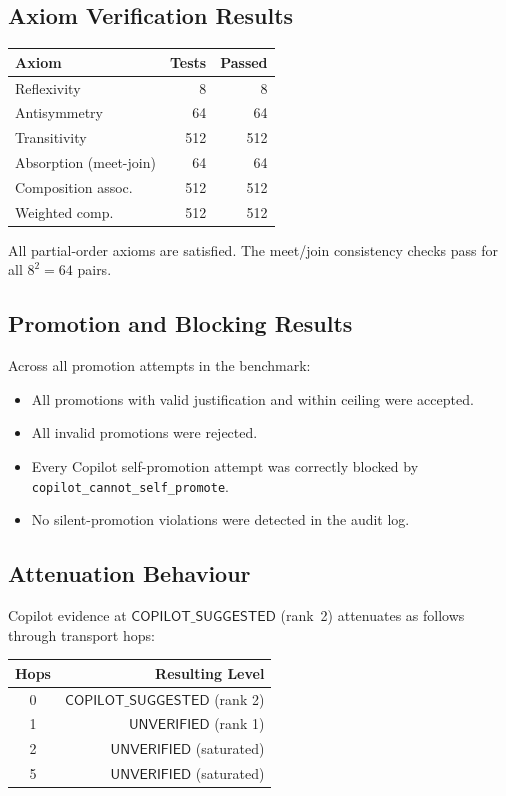 \documentclass[11pt]{article}
\newcommand{\CopSugg}{\mathsf{COPILOT\_SUGGESTED}}
\newcommand{\Unver}{\mathsf{UNVERIFIED}}
\begin{document}
\subsection{Axiom Verification Results}

\begin{center}
\begin{tabular}{lrr}
\toprule
\textbf{Axiom} & \textbf{Tests} & \textbf{Passed} \\
\midrule
Reflexivity        & 8    & 8 \\
Antisymmetry       & 64   & 64 \\
Transitivity       & 512  & 512 \\
Absorption (meet-join) & 64 & 64 \\
Composition assoc. & 512 & 512 \\
Weighted comp.     & 512 & 512 \\
\bottomrule
\end{tabular}
\end{center}

All partial-order axioms are satisfied.  The meet/join consistency checks
pass for all $8^2 = 64$ pairs.

\subsection{Promotion and Blocking Results}

Across all promotion attempts in the benchmark:
\begin{itemize}[leftmargin=2em]
  \item All promotions with valid justification and within ceiling were accepted.
  \item All invalid promotions were rejected.
  \item Every Copilot self-promotion attempt was correctly blocked by
        \texttt{copilot\_cannot\_self\_promote}.
  \item No silent-promotion violations were detected in the audit log.
\end{itemize}

\subsection{Attenuation Behaviour}

Copilot evidence at $\CopSugg$ (rank~2) attenuates as follows through
transport hops:
\begin{center}
\begin{tabular}{cr}
\toprule
\textbf{Hops} & \textbf{Resulting Level} \\
\midrule
0 & $\CopSugg$ (rank 2) \\
1 & $\Unver$ (rank 1) \\
2 & $\Unver$ (saturated) \\
5 & $\Unver$ (saturated) \\
\bottomrule
\end{tabular}
\end{center}
\end{document}
